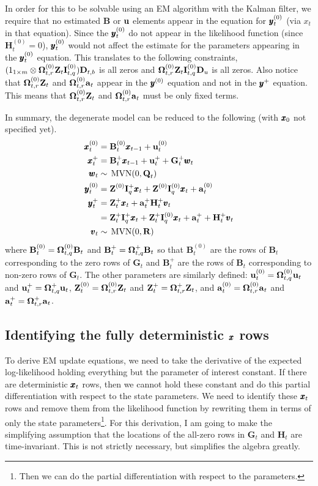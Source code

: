 \documentclass[]{article}
\def\OMG{\mbox{\boldmath $\Omega$}}
\def\ZZ{\mbox{$\mathbf Z$}}	\def\zz{\mbox{$\mathbf z$}}
\def\BB{\mbox{$\mathbf B$}}	\def\bb{\mbox{$\mathbf b$}}
\def\DD{\mbox{$\mathbf D$}}	\def\dd{\mbox{$\mathbf d$}}
\def\GG{\mbox{$\mathbf G$}}	\def\gg{\mbox{$\mathbf g$}}
\def\HH{\mbox{$\mathbf H$}}	\def\hh{\mbox{$\mathbf h$}}
\def\II{\mbox{$\mathbf I$}} \def\ii{\mbox{$\mathbf i$}}
\def\QQ{\mbox{$\mathbf Q$}}	 \def\qq{\mbox{$\mathbf q$}}
\def\RR{\mbox{$\mathbf R$}}	 \def\rr{\mbox{$\mathbf r$}}
\def\MVN{\,\textup{\textrm{MVN}}}
\begin{document}
In order for this to be solvable using an EM algorithm with the Kalman filter, we require that no estimated $\BB$ or $\mbox{$\mathbf u$}$ elements appear in the equation for $\mbox{$\pmb{y}$}_t^{(0)}$ (via $x_t$ in that equation).  Since the $\mbox{$\pmb{y}$}_t^{(0)}$ do not appear in the likelihood function (since $\HH_t^{(0)}=0$), $\mbox{$\pmb{y}$}_t^{(0)}$ would not affect the estimate for the parameters appearing in the $\mbox{$\pmb{y}$}_t^{(0)}$ equation.  This translates to the following constraints, $(1_{1 \times m} \otimes \OMG_{t,r}^{(0)}\ZZ_t\II_{t,q}^{(0)})\DD_{t,b}$ is all zeros and $\OMG_{t,r}^{(0)}\ZZ_t\II_{t,q}^{(0)}\DD_u$ is all zeros.
Also notice that $\OMG_{t,r}^{(0)}\ZZ_t$ and $\OMG_{t,r}^{(0)}\aa_t$ appear in the $\mbox{$\pmb{y}$}^{(0)}$ equation and not in the $\mbox{$\pmb{y}$}^+$ equation.  This means that $\OMG_{t,r}^{(0)}\ZZ_t$ and $\OMG_{t,r}^{(0)}\aa_t$ must be only fixed terms.

In summary, the degenerate model can be reduced to the following (with $\mbox{$\pmb{x}$}_0$ not specified yet).
\begin{equation}\label{eq:degen.model2}
\begin{split}
\xx_t^{(0)}&=\BB_t^{(0)}\xx_{t-1} + \uu_t^{(0)}\\
\xx_t^+&=\BB_t^+\xx_{t-1} + \uu_t^+ + \GG_t^+\ww_t\\
\ww_t &\sim \MVN(0,\QQ_t)
\\
\yy_t^{(0)}&=\ZZ^{(0)}\II_q^+\xx_t + \ZZ^{(0)}\II_q^{(0)}\xx_t + \aa^{(0)}_t\\
\yy_t^+&=\ZZ_t^+\xx_t + \aa_t^+ \HH_t^+\vv_t\\
&=\ZZ_t^+\II_q^+\xx_t + \ZZ_t^+\II_q^{(0)}\xx_t + \aa_t^+ + \HH_t^+\vv_t\\
\vv_t &\sim \MVN(0,\RR)
\end{split}
\end{equation}
where $\BB_t^{(0)}=\OMG_{t,q}^{(0)}\BB_t$ and $\BB_t^+=\OMG_{t,q}^+\BB_t$ so that $\BB_t^{(0)}$ are the rows of $\BB_t$ corresponding to the zero rows of $\GG_t$ and $\BB_t^+$ are the rows of $\BB_t$ corresponding to non-zero rows of  $\GG_t$.  The other parameters are similarly defined: $\uu_t^{(0)}=\OMG_{t,q}^{(0)}\uu_t$  and $\uu_t^+=\OMG_{t,q}^+\uu_t$, $\ZZ_t^{(0)}=\OMG_{t,r}^{(0)}\ZZ_t$  and $\ZZ_t^+=\OMG_{t,r}^+\ZZ_t$, and $\aa_t^{(0)}=\OMG_{t,r}^{(0)}\aa_t$  and $\aa_t^+=\OMG_{t,r}^+\aa_t$.

\subsection{Identifying the fully deterministic $\mbox{$\pmb{x}$}$  rows}\label{sec:ident.xds}
To derive EM update equations, we need to take the derivative of the expected log-likelihood holding everything but the parameter of interest constant.  If there are deterministic $\mbox{$\pmb{x}$}_t$ rows, then we cannot hold these constant and do this partial differentiation with respect to the state parameters.  We need to identify these $\mbox{$\pmb{x}$}_t$ rows and remove them from the likelihood function by rewriting them in terms of only the state parameters\footnote{Then we can do the partial differentiation with respect to the parameters.}. For this derivation, I am going to make the simplifying assumption that the locations of the all-zero rows in $\GG_t$ and $\HH_t$ are time-invariant.  This is not strictly necessary, but simplifies the algebra greatly.
 
\end{document}
